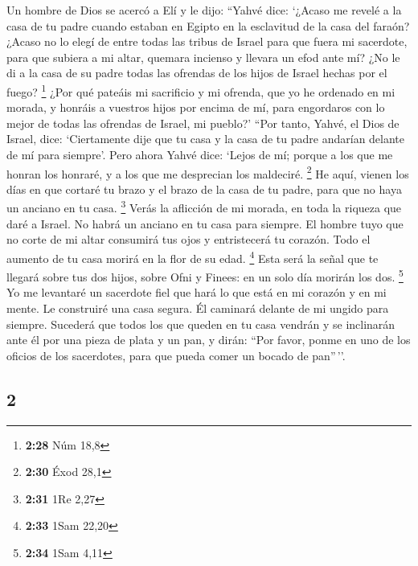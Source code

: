 \begin{paracol}{2}
 Un hombre de Dios se acercó a Elí y le dijo: ``Yahvé
dice: `¿Acaso me revelé a la casa de tu padre cuando estaban en Egipto
en la esclavitud de la casa del faraón?  ¿Acaso no lo
elegí de entre todas las tribus de Israel para que fuera mi sacerdote,
para que subiera a mi altar, quemara incienso y llevara un efod ante mí?
¿No le di a la casa de su padre todas las ofrendas de los hijos de
Israel hechas por el fuego? \footnote{\textbf{2:28} Núm 18,8}
 ¿Por qué pateáis mi sacrificio y mi ofrenda, que yo he
ordenado en mi morada, y honráis a vuestros hijos por encima de mí, para
engordaros con lo mejor de todas las ofrendas de Israel, mi pueblo?'
 ``Por tanto, Yahvé, el Dios de Israel, dice:
`Ciertamente dije que tu casa y la casa de tu padre andarían delante de
mí para siempre'. Pero ahora Yahvé dice: `Lejos de mí; porque a los que
me honran los honraré, y a los que me desprecian los maldeciré.
\footnote{\textbf{2:30} Éxod 28,1}  He aquí, vienen los
días en que cortaré tu brazo y el brazo de la casa de tu padre, para que
no haya un anciano en tu casa. \footnote{\textbf{2:31} 1Re 2,27}
 Verás la aflicción de mi morada, en toda la riqueza que
daré a Israel. No habrá un anciano en tu casa para siempre.
 El hombre tuyo que no corte de mi altar consumirá tus
ojos y entristecerá tu corazón. Todo el aumento de tu casa morirá en la
flor de su edad. \footnote{\textbf{2:33} 1Sam 22,20} 
Esta será la señal que te llegará sobre tus dos hijos, sobre Ofni y
Finees: en un solo día morirán los dos. \footnote{\textbf{2:34} 1Sam
  4,11}  Yo me levantaré un sacerdote fiel que hará lo
que está en mi corazón y en mi mente. Le construiré una casa segura. Él
caminará delante de mi ungido para siempre.  Sucederá que
todos los que queden en tu casa vendrán y se inclinarán ante él por una
pieza de plata y un pan, y dirán: ``Por favor, ponme en uno de los
oficios de los sacerdotes, para que pueda comer un bocado de pan''\,''.

\switchcolumn
\begin{otherlanguage}{english}

\hypertarget{section-3}{%
\section{2}\label{section-3}}


\end{otherlanguage}
\end{paracol}
